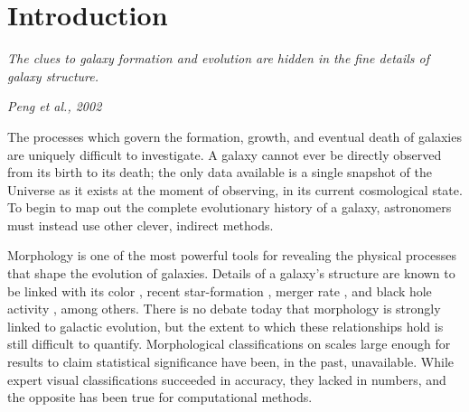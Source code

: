 \chapter{Introduction}
\label{chap:intro}
\epigraph{\textit{The clues to galaxy formation and evolution are hidden in the fine details of galaxy structure.}}{\textit{Peng et al., 2002}}

The processes which govern the formation, growth, and eventual death of galaxies are uniquely difficult to investigate. A galaxy cannot ever be directly observed from its birth to its death; the only data available is a single snapshot of the Universe as it exists at the moment of observing, in its current cosmological state. To begin to map out the complete evolutionary history of a galaxy, astronomers must instead use other clever, indirect methods.

Morphology is one of the most powerful tools for revealing the physical processes that shape the evolution of galaxies. Details of a galaxy's structure are known to be linked with its color \citep{Tully1982,Strateva2001,Baldry2004}, recent star-formation \citep{Conselice2006,Martin2007,Mignoli2009}, merger rate \citep{Hammer2009,Oesch2010,Smethurst2017}, and black hole activity \citep{Athanassoula1992,Friedli1993,Schawinski2010}, among others. There is no debate today that morphology is strongly linked to galactic evolution, but the extent to which these relationships hold is still difficult to quantify. Morphological classifications on scales large enough for results to claim statistical significance have been, in the past, unavailable. While expert visual classifications succeeded in accuracy, they lacked in numbers, and the opposite has been true for computational methods. 

